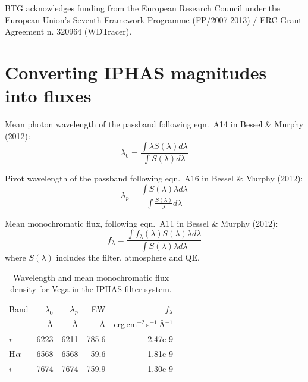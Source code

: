 \documentclass[useAMS,usenatbib]{mn2e}
\def\ha{\mbox{H$\rm \alpha$}}
\begin{document}
BTG acknowledges funding from the
European Research Council under the European Union's Seventh Framework
Programme (FP/2007-2013) / ERC Grant Agreement n. 320964 (WDTracer).

\label{lastpage}




\newpage
\appendix


\section{Converting IPHAS magnitudes into fluxes}

Mean photon wavelength of the passband following eqn.~A14 in Bessel \& Murphy (2012):
\begin{equation}
\lambda_0 = \frac{\int{\lambda S(\lambda) d \lambda}}
{\int{S(\lambda)d\lambda}}
\end{equation}

Pivot wavelength of the passband following eqn.~A16 in Bessel \& Murphy (2012):
\begin{equation}
\lambda_p = \frac{\int{S(\lambda) \lambda d \lambda}}
{\int{\frac{S(\lambda)}{\lambda} d\lambda}}
\end{equation}

Mean monochromatic flux,
following eqn.~A11 in Bessel \& Murphy (2012):
\begin{equation}
f_\lambda = \frac{\int{f_\lambda(\lambda) S(\lambda) \lambda d \lambda}}
{\int{S(\lambda)\lambda d \lambda}}
\end{equation}
where $S(\lambda)$ includes the filter, atmosphere and QE.

\begin{table}[h]
    \caption{Wavelength and mean monochromatic flux density for Vega in the IPHAS filter system.}
    \label{tbl:flux}
    \begin{tabular}{lrrrr}
    \toprule
     Band & $\lambda_0$ & $\lambda_p$ & EW  & $f_\lambda$   \\
     & \AA & \AA & \AA & erg\,cm$^{-2}$\,s$^{-1}$\,\AA$^{-1}$  \\
    \midrule
$r$ &  6223  &   6211  &  785.6  &  2.47e-9  \\
\ha &  6568  &   6568  &   59.6  &  1.81e-9  \\
$i$ &  7674  &   7674  &  759.9  &  1.30e-9   \\
    \bottomrule
    \end{tabular}
\end{table}
\end{document}
